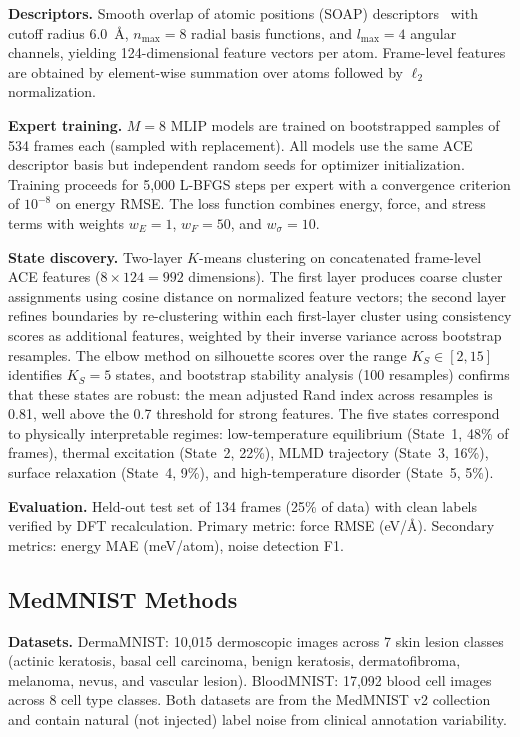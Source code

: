 \documentclass{article}
\begin{document}
\textbf{Descriptors.} Smooth overlap of atomic positions (SOAP) descriptors~\cite{bartok2013soap} with cutoff radius 6.0~\AA, $n_{\text{max}} = 8$ radial basis functions, and $l_{\text{max}} = 4$ angular channels, yielding 124-dimensional feature vectors per atom. Frame-level features are obtained by element-wise summation over atoms followed by $\ell_2$ normalization.

\textbf{Expert training.} $M = 8$ MLIP models are trained on bootstrapped samples of 534 frames each (sampled with replacement). All models use the same ACE descriptor basis but independent random seeds for optimizer initialization. Training proceeds for 5,000 L-BFGS steps per expert with a convergence criterion of $10^{-8}$ on energy RMSE. The loss function combines energy, force, and stress terms with weights $w_E = 1$, $w_F = 50$, and $w_\sigma = 10$.

\textbf{State discovery.} Two-layer $K$-means clustering on concatenated frame-level ACE features ($8 \times 124 = 992$ dimensions). The first layer produces coarse cluster assignments using cosine distance on normalized feature vectors; the second layer refines boundaries by re-clustering within each first-layer cluster using consistency scores as additional features, weighted by their inverse variance across bootstrap resamples. The elbow method on silhouette scores over the range $K_S \in [2, 15]$ identifies $K_S = 5$ states, and bootstrap stability analysis (100 resamples) confirms that these states are robust: the mean adjusted Rand index across resamples is 0.81, well above the 0.7 threshold for strong features. The five states correspond to physically interpretable regimes: low-temperature equilibrium (State~1, 48\% of frames), thermal excitation (State~2, 22\%), MLMD trajectory (State~3, 16\%), surface relaxation (State~4, 9\%), and high-temperature disorder (State~5, 5\%).

\textbf{Evaluation.} Held-out test set of 134 frames (25\% of data) with clean labels verified by DFT recalculation. Primary metric: force RMSE (eV/\AA). Secondary metrics: energy MAE (meV/atom), noise detection F1.

\subsection{MedMNIST Methods}
\label{sec:methods_med}

\textbf{Datasets.} DermaMNIST: 10,015 dermoscopic images across 7 skin lesion classes (actinic keratosis, basal cell carcinoma, benign keratosis, dermatofibroma, melanoma, nevus, and vascular lesion). BloodMNIST: 17,092 blood cell images across 8 cell type classes. Both datasets are from the MedMNIST v2 collection~\cite{yang2023medmnist} and contain natural (not injected) label noise from clinical annotation variability.
\end{document}
